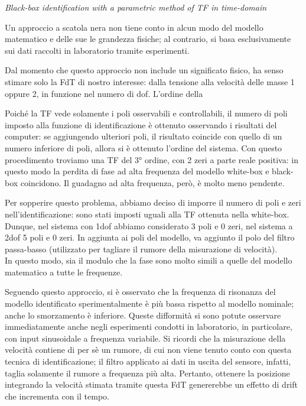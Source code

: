 \textit{Black-box identification with a parametric method of TF in time-domain}
\\ \par Un approccio a scatola nera non tiene conto in alcun modo del modello matematico e delle sue le grandezza fisiche; al contrario, si basa esclusivamente sui dati raccolti in laboratorio tramite esperimenti.


Dal momento che questo approccio non include un significato fisico, ha senso stimare solo la FdT di nostro interesse: dalla tensione alla velocità delle masse 1 oppure 2, in funzione nel numero di dof. 
L'ordine della 





Poiché la TF vede solamente i poli osservabili e controllabili, il numero di poli imposto alla funzione di identificazione è ottenuto osservando i risultati del computer: se aggiungendo ulteriori poli, il risultato coincide con quello di un numero inferiore di poli, allora si è ottenuto l'ordine del sistema.
Con questo procedimento troviamo una TF del 3° ordine, con 2 zeri a parte reale positiva: in questo modo la perdita di fase ad alta frequenza del modello white-box e black-box coincidono. Il guadagno ad alta frequenza, però, è molto meno pendente.

Per sopperire questo problema, abbiamo deciso di imporre il numero di poli e zeri nell'identificazione: sono stati imposti uguali alla TF ottenuta nella white-box. Dunque, nel sistema con 1dof abbiamo considerato 3 poli e 0 zeri, nel sistema a 2dof 5 poli e 0 zeri.
In aggiunta ai poli del modello, va aggiunto il polo del filtro passa-basso (utilizzato per tagliare il rumore della misurazione di velocità). \\
In questo modo, sia il modulo che la fase sono molto simili a quelle del modello matematico a tutte le frequenze.

Seguendo questo approccio, si è osservato che la frequenza di risonanza del modello identificato sperimentalmente è più bassa rispetto al modello nominale; anche lo smorzamento è inferiore.
Queste difformità si sono potute osservare immediatamente anche negli esperimenti condotti in laboratorio, in particolare, con input sinusoidale a frequenza variabile.
Si ricordi che la misurazione della velocità contiene di per sè un rumore, di cui non viene tenuto conto con questa tecnica di identificazione; il filtro applicato ai dati in uscita del sensore, infatti, taglia solamente il rumore a frequenza più alta.
Pertanto, ottenere la posizione integrando la velocità stimata tramite questa FdT genererebbe un effetto di drift che incrementa con il tempo.

